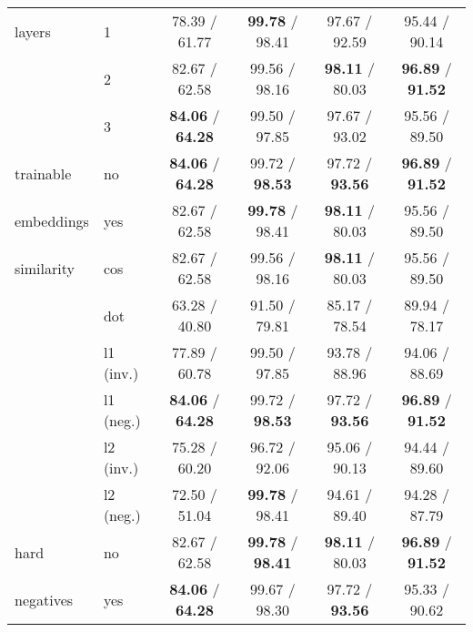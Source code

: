 \documentclass[runningheads]{llncs}
\begin{document}
\begin{table}[t]
\begin{tabular*}{\textwidth}{ll*{4}{@{\extracolsep{\fill} }c}}
layers                        & 1 &                    78.39 / 61.77 &           \textbf{99.78} / 98.41 &           97.67 / 92.59 &                    95.44 / 90.14 \\
                        & 2 &                    82.67 / 62.58 &                    99.56 / 98.16 &  \textbf{98.11} / 80.03 &  \textbf{96.89} / \textbf{91.52} \\
                        & 3 &  \textbf{84.06} / \textbf{64.28} &                    99.50 / 97.85 &           97.67 / 93.02 &                    95.56 / 89.50 \\
\midrule trainable  & no &  \textbf{84.06} / \textbf{64.28} &           99.72 / \textbf{98.53} &  97.72 / \textbf{93.56} &  \textbf{96.89} / \textbf{91.52} \\
embeddings                        & yes &                    82.67 / 62.58 &           \textbf{99.78} / 98.41 &  \textbf{98.11} / 80.03 &                    95.56 / 89.50 \\
\midrule similarity & cos &                    82.67 / 62.58 &                    99.56 / 98.16 &  \textbf{98.11} / 80.03 &                    95.56 / 89.50 \\
                        & dot &                    63.28 / 40.80 &                    91.50 / 79.81 &           85.17 / 78.54 &                    89.94 / 78.17 \\
                        & l1 (inv.) &                    77.89 / 60.78 &                    99.50 / 97.85 &           93.78 / 88.96 &                    94.06 / 88.69 \\
                        & l1 (neg.) &  \textbf{84.06} / \textbf{64.28} &           99.72 / \textbf{98.53} &  97.72 / \textbf{93.56} &  \textbf{96.89} / \textbf{91.52} \\
                        & l2 (inv.) &                    75.28 / 60.20 &                    96.72 / 92.06 &           95.06 / 90.13 &                    94.44 / 89.60 \\
                        & l2 (neg.) &                    72.50 / 51.04 &           \textbf{99.78} / 98.41 &           94.61 / 89.40 &                    94.28 / 87.79 \\
\midrule hard  & no &                    82.67 / 62.58 &  \textbf{99.78} / \textbf{98.41} &  \textbf{98.11} / 80.03 &  \textbf{96.89} / \textbf{91.52} \\
negatives                        & yes &  \textbf{84.06} / \textbf{64.28} &                    99.67 / 98.30 &  97.72 / \textbf{93.56} &                    95.33 / 90.62 \\
\bottomrule
\end{tabular*} \end{table}
\end{document}

